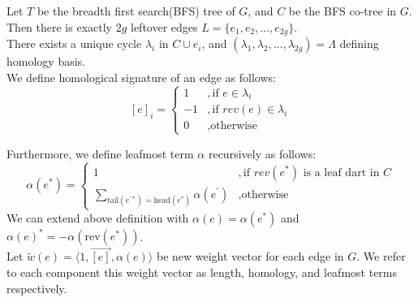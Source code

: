 \documentclass{article}
\begin{document}
Let $T$ be the breadth first search(BFS) tree of $G$, and $C$ be the BFS co-tree
in $G$. Then there is exactly $2g$ leftover edges $L = \{e_1, e_2, \ldots, e_{2g}\}$. \\

There exists a unique cycle $\lambda_i$ in $C \cup {e_i}$, and $(\lambda_1, 
\lambda_2, \ldots, \lambda_{2g}) = \Lambda$ defining homology basis. \\
We define homological signature of an edge as follows:
\[ [e]_{i} = \begin{cases} 1 & ,\mbox{if } e \in \lambda_i \\
                          -1 & ,\mbox{if } rev(e) \in \lambda_i \\
                           0 & ,\mbox{otherwise} \end{cases}\]

Furthermore, we define leafmost term $\alpha$ recursively as follows: \\
\[ \alpha(e^*) = \begin{cases} 1 & ,\mbox{if } rev(e^*) \mbox{ is a leaf dart in } C \\
                           \sum \limits_{ \text{tail}(e^{'*})
                           = \text{head}(e^*) } \alpha(e^{'}) & ,
                           \mbox{otherwise} \end{cases}\]
We can extend above definition with $\alpha(e) = \alpha(e^*)$ and 
  $\alpha(e)^* = - \alpha(\text{rev}(e^*))$. \\

Let $\tilde w(e) = \langle 1, \vec{[e]}, \alpha(e) \rangle$ be new
weight vector for each edge in $G$. We refer to each component this weight vector
as length, homology, and leafmost terms respectively.
\end{document}

